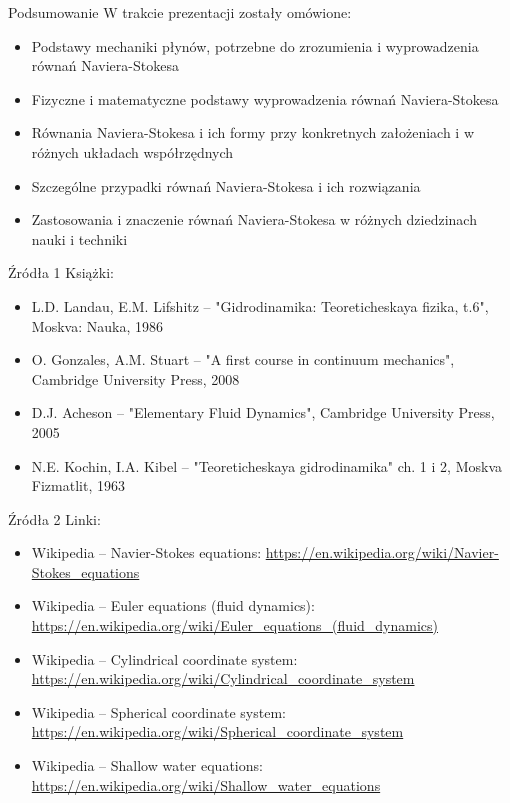 \documentclass{beamer}
\begin{document}
\begin{frame}{Podsumowanie}
	W trakcie prezentacji zostały omówione:
	\begin{itemize}
		\item Podstawy mechaniki płynów, potrzebne do zrozumienia i wyprowadzenia
		równań Naviera-Stokesa
		\item Fizyczne i matematyczne podstawy wyprowadzenia równań Naviera-Stokesa
		\item Równania Naviera-Stokesa i ich formy przy konkretnych założeniach i w
		różnych układach współrzędnych
		\item Szczególne przypadki równań Naviera-Stokesa i ich rozwiązania
		\item Zastosowania i znaczenie równań Naviera-Stokesa w różnych dziedzinach nauki i techniki 
	\end{itemize}
\end{frame}

\begin{frame}{Źródła 1}
	Książki:
	\begin{itemize}
		\item L.D. Landau, E.M. Lifshitz -- "Gidrodinamika: Teoreticheskaya fizika, t.6", Moskva: Nauka, 1986
		\item O. Gonzales, A.M. Stuart -- "A first course in continuum mechanics", Cambridge University Press, 2008
		\item D.J. Acheson -- "Elementary Fluid Dynamics", Cambridge University Press, 2005
		\item N.E. Kochin, I.A. Kibel --
		"Teoreticheskaya gidrodinamika" ch. 1 i 2, Moskva Fizmatlit, 1963
	\end{itemize}
\end{frame}

\begin{frame}{Źródła 2}
	Linki:
	\begin{itemize}
		\item Wikipedia -- Navier-Stokes equations:
		\url{https://en.wikipedia.org/wiki/Navier-Stokes_equations}

		\item Wikipedia -- Euler equations (fluid dynamics):\\
		\url{https://en.wikipedia.org/wiki/Euler_equations_(fluid_dynamics)}

		\item Wikipedia -- Cylindrical coordinate system:
		\url{https://en.wikipedia.org/wiki/Cylindrical_coordinate_system}

		\item Wikipedia -- Spherical coordinate system:
		\url{https://en.wikipedia.org/wiki/Spherical_coordinate_system}

		\item Wikipedia -- Shallow water equations:
		\url{https://en.wikipedia.org/wiki/Shallow_water_equations}
	\end{itemize}
\end{frame}
\end{document}
